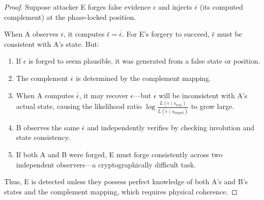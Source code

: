 \documentclass[twocolumn,10pt,a4paper]{article}
\theoremstyle{plain}
\theoremstyle{definition}
\newcommand{\comp}[1]{\overline{#1}}
\begin{document}
\begin{proof}
Suppose attacker E forges false evidence $\epsilon$ and injects $\comp{\epsilon}$ (its computed complement) at the phase-locked position.

When A observes $\comp{\epsilon}$, it computes $\hat{\epsilon} = \comp{\comp{\epsilon}}$. For E's forgery to succeed, $\hat{\epsilon}$ must be consistent with A's state. But:

\begin{enumerate}
\item If $\epsilon$ is forged to seem plausible, it was generated from a false state or position.
\item The complement $\comp{\epsilon}$ is determined by the complement mapping.
\item When A computes $\comp{\comp{\epsilon}}$, it may recover $\epsilon$---but $\epsilon$ will be inconsistent with A's actual state, causing the likelihood ratio $\log \frac{L(\hat{\epsilon} \mid s_{\text{real}})}{L(\hat{\epsilon} \mid s_{\text{forged}})}$ to grow large.
\item B observes the same $\comp{\epsilon}$ and independently verifies by checking involution and state consistency.
\item If both A and B were forged, E must forge consistently across two independent observers---a cryptographically difficult task.
\end{enumerate}

Thus, E is detected unless they possess perfect knowledge of both A's and B's states and the complement mapping, which requires physical coherence.
\end{proof}
\end{document}
